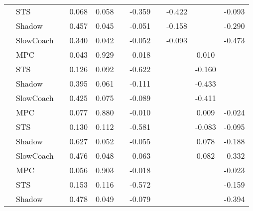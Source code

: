 \begin{tabular}{|l|l|*{9}{c|}}
                                                           & STS &       &     0.068 &     0.058 &     & -0.359 &     &  -0.422 &      &   -0.093 \\
                                                           & Shadow &       &     0.457 &     0.045 &     & -0.051 &     &  -0.158 &      &   -0.290 \\
                                                           & SlowCoach &       &     0.340 &     0.042 &     & -0.052 &     &  -0.093 &      &   -0.473 \\
\midrule
[False, True, True, False, True, False, False, True, False] & MPC &       &     0.043 &     0.929 &     & -0.018 &     &      &   0.010 &       \\
                                                           & STS &       &     0.126 &     0.092 &     & -0.622 &     &      &  -0.160 &       \\
                                                           & Shadow &       &     0.395 &     0.061 &     & -0.111 &     &      &  -0.433 &       \\
                                                           & SlowCoach &       &     0.425 &     0.075 &     & -0.089 &     &      &  -0.411 &       \\
\midrule
[False, True, True, False, True, False, False, True, True] & MPC &       &     0.077 &     0.880 &     & -0.010 &     &      &   0.009 &   -0.024 \\
                                                           & STS &       &     0.130 &     0.112 &     & -0.581 &     &      &  -0.083 &   -0.095 \\
                                                           & Shadow &       &     0.627 &     0.052 &     & -0.055 &     &      &   0.078 &   -0.188 \\
                                                           & SlowCoach &       &     0.476 &     0.048 &     & -0.063 &     &      &   0.082 &   -0.332 \\
\midrule
[False, True, True, False, True, False, False, False, True] & MPC &       &     0.056 &     0.903 &     & -0.018 &     &      &      &   -0.023 \\
                                                           & STS &       &     0.153 &     0.116 &     & -0.572 &     &      &      &   -0.159 \\
                                                           & Shadow &       &     0.478 &     0.049 &     & -0.079 &     &      &      &   -0.394 \\

\end{tabular}
